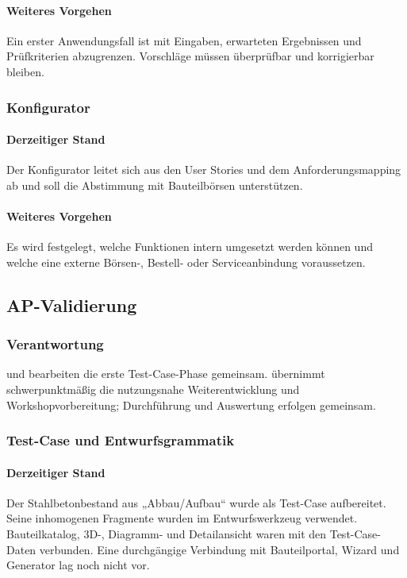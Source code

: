 \documentclass[type=zwischenbericht]{zukunftbau}
\begin{document}
\paragraph{Weiteres Vorgehen}
Ein erster Anwendungsfall ist mit Eingaben, erwarteten Ergebnissen und Prüfkriterien abzugrenzen. Vorschläge müssen überprüfbar und korrigierbar bleiben.

\subsubsection{Konfigurator}

\paragraph{Derzeitiger Stand}
Der Konfigurator leitet sich aus den User Stories und dem Anforderungsmapping ab und soll die Abstimmung mit Bauteilbörsen unterstützen.

\paragraph{Weiteres Vorgehen}
Es wird festgelegt, welche Funktionen intern umgesetzt werden können und welche eine externe Börsen-, Bestell- oder Serviceanbindung voraussetzen.

\subsection{AP-Validierung}

\subsubsection{Verantwortung}
 und  bearbeiten die erste Test-Case-Phase gemeinsam.  übernimmt schwerpunktmäßig die nutzungsnahe Weiterentwicklung und Workshopvorbereitung; Durchführung und Auswertung erfolgen gemeinsam.

\subsubsection{Test-Case und Entwurfsgrammatik}

\paragraph{Derzeitiger Stand}
Der Stahlbetonbestand aus „Abbau/Aufbau“ wurde als Test-Case aufbereitet. Seine inhomogenen Fragmente wurden im Entwurfswerkzeug verwendet. Bauteilkatalog, 3D-, Diagramm- und Detailansicht waren mit den Test-Case-Daten verbunden. Eine durchgängige Verbindung mit Bauteilportal, Wizard und Generator lag noch nicht vor.
\end{document}
